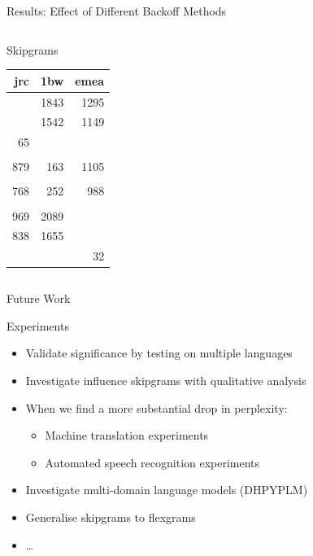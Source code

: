 \begin{frame}{Results: Effect of Different Backoff Methods}
{\begin{columns}[T,totalwidth=\textwidth]
\begin{column}{0.5\textwidth}
                \begin{block}{Skipgrams}
                    \begin{tabular}{rrr}
                        jrc & 1bw & emea \\ \hline
                        \cellcolor{green!25}{13} & 1843 & 1295 \\
                        \cellcolor{green!25}{13} & 1542 & 1149 \\
                        65 & \cellcolor{green!25}{1195} & \cellcolor{green!25}{939} \\
                        && \\
                        879 & 163 & 1105 \\
                        \cellcolor{green!25}{751} & \cellcolor{green!25}{162} & \cellcolor{green!25}{921} \\
                        768 & 252 & 988 \\
                        && \\
                        969 & 2089 & \cellcolor{green!25}{4} \\
                        838 & 1655 & \cellcolor{green!25}{4} \\
                        \cellcolor{green!25}{581} & \cellcolor{green!25}{1155} & 32
                    \end{tabular}
                \end{block}
            \end{column}
        \end{columns}
    }
\end{frame}
\note[itemize]{
}

\begin{frame}{Future Work}
    \begin{block}{Experiments}
        \begin{itemize}
            \item Validate significance by testing on multiple languages
            \item Investigate influence skipgrams with qualitative analysis
            \item When we find a more substantial drop in perplexity:
                \begin{itemize}
                    \item Machine translation experiments
                    \item Automated speech recognition experiments
                \end{itemize}
            \item Investigate multi-domain language models (DHPYPLM)
            \item Generalise skipgrams to flexgrams
            \item \ldots
        \end{itemize}
    \end{block}
\end{frame}
\note[itemize]{
}

